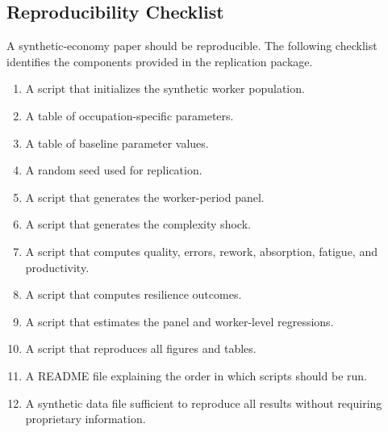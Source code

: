 \subsection{Reproducibility Checklist}
\label{app:reproducibility}

A synthetic-economy paper should be reproducible. The following checklist identifies the components provided in the replication package.

\begin{enumerate}
    \item A script that initializes the synthetic worker population.
    \item A table of occupation-specific parameters.
    \item A table of baseline parameter values.
    \item A random seed used for replication.
    \item A script that generates the worker-period panel.
    \item A script that generates the complexity shock.
    \item A script that computes quality, errors, rework, absorption, fatigue, and productivity.
    \item A script that computes resilience outcomes.
    \item A script that estimates the panel and worker-level regressions.
    \item A script that reproduces all figures and tables.
    \item A README file explaining the order in which scripts should be run.
    \item A synthetic data file sufficient to reproduce all results without requiring proprietary information.
\end{enumerate}
